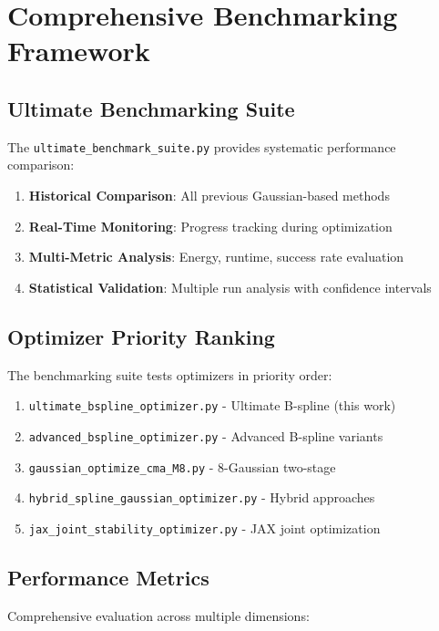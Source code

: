 \documentclass[11pt,a4paper]{article}
\begin{document}
\section{Comprehensive Benchmarking Framework}

\subsection{Ultimate Benchmarking Suite}

The \texttt{ultimate\_benchmark\_suite.py} provides systematic performance comparison:

\begin{enumerate}
\item \textbf{Historical Comparison}: All previous Gaussian-based methods
\item \textbf{Real-Time Monitoring}: Progress tracking during optimization
\item \textbf{Multi-Metric Analysis}: Energy, runtime, success rate evaluation
\item \textbf{Statistical Validation}: Multiple run analysis with confidence intervals
\end{enumerate}

\subsection{Optimizer Priority Ranking}

The benchmarking suite tests optimizers in priority order:

\begin{enumerate}
\item \texttt{ultimate\_bspline\_optimizer.py} - Ultimate B-spline (this work)
\item \texttt{advanced\_bspline\_optimizer.py} - Advanced B-spline variants
\item \texttt{gaussian\_optimize\_cma\_M8.py} - 8-Gaussian two-stage
\item \texttt{hybrid\_spline\_gaussian\_optimizer.py} - Hybrid approaches
\item \texttt{jax\_joint\_stability\_optimizer.py} - JAX joint optimization
\end{enumerate}

\subsection{Performance Metrics}

Comprehensive evaluation across multiple dimensions:
\end{document}
